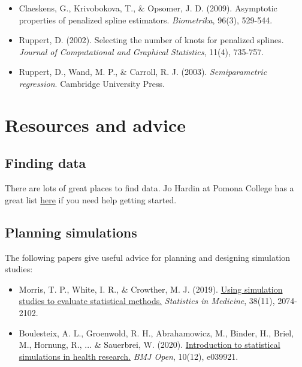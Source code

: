 \documentclass[11pt]{article}
\begin{document}
\begin{itemize}
\begin{itemize}
\item Claeskens, G., Krivobokova, T., \& Opsomer, J. D. (2009). Asymptotic properties of penalized spline estimators. \textit{Biometrika}, 96(3), 529-544.

\item Ruppert, D. (2002). Selecting the number of knots for penalized splines. \textit{Journal of Computational and Graphical Statistics}, 11(4), 735-757.

\item Ruppert, D., Wand, M. P., \& Carroll, R. J. (2003). \textit{Semiparametric regression}. Cambridge University Press.
\end{itemize}
\end{itemize}

\section*{Resources and advice}

\subsection*{Finding data}

There are lots of great places to find data. Jo Hardin at Pomona College has a great list \href{https://hardin47.netlify.app/courses/data/}{here} if you need help getting started.

\subsection*{Planning simulations}

The following papers give useful advice for planning and designing simulation studies:

\begin{itemize}
\item Morris, T. P., White, I. R., \& Crowther, M. J. (2019). \href{https://onlinelibrary.wiley.com/doi/10.1002/sim.8086}{Using simulation studies to evaluate statistical methods.} \textit{Statistics in Medicine}, 38(11), 2074-2102.

\item Boulesteix, A. L., Groenwold, R. H., Abrahamowicz, M., Binder, H., Briel, M., Hornung, R., ... \& Sauerbrei, W. (2020). \href{https://bmjopen.bmj.com/content/10/12/e039921}{Introduction to statistical simulations in health research.} \textit{BMJ Open}, 10(12), e039921.
\end{itemize}
\end{document}
